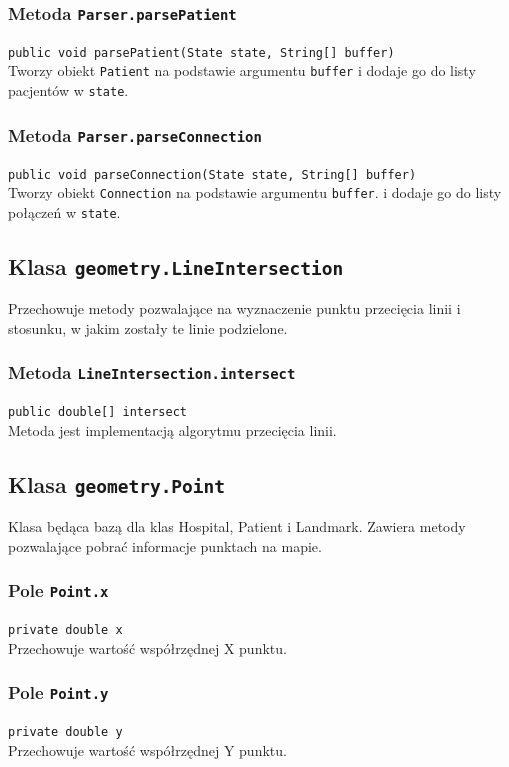 \documentclass{article}
\begin{document}
\subsubsection{Metoda \texttt{Parser.parsePatient}}
\texttt{public void parsePatient(State state, String[] buffer)} \\
Tworzy obiekt \texttt{Patient} na podstawie argumentu \texttt{buffer} i dodaje go do listy pacjentów w \texttt{state}. 

\subsubsection{Metoda \texttt{Parser.parseConnection}}
\texttt{public void parseConnection(State state, String[] buffer)} \\
Tworzy obiekt \texttt{Connection} na podstawie argumentu \texttt{buffer}. i dodaje go do listy połączeń w \texttt{state}. 

\pagebreak
\subsection{Klasa \texttt{geometry.LineIntersection}}
Przechowuje metody pozwalające na wyznaczenie punktu przecięcia linii i stosunku, w jakim zostały te linie podzielone.

\subsubsection{Metoda \texttt{LineIntersection.intersect}}
\texttt{public double[] intersect} \\
Metoda jest implementacją algorytmu przecięcia linii.

\subsection{Klasa \texttt{geometry.Point}}
Klasa będąca bazą dla klas Hospital, Patient i Landmark. Zawiera metody pozwalające pobrać informacje punktach na mapie.

\subsubsection{Pole \texttt{Point.x}}
\texttt{private double x} \\
Przechowuje wartość współrzędnej X punktu.

\subsubsection{Pole \texttt{Point.y}}
\texttt{private double y} \\
Przechowuje wartość współrzędnej Y punktu.
\end{document}
